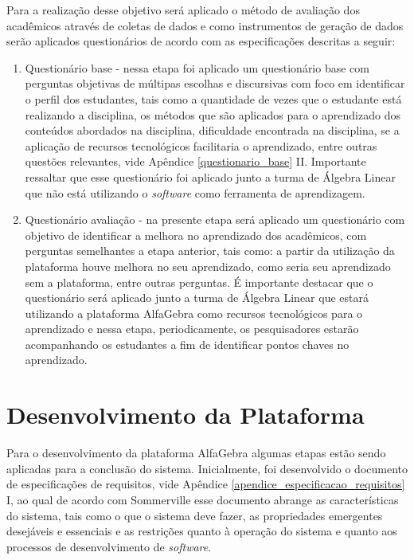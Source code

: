 Para a realização desse objetivo será aplicado o método de avaliação dos acadêmicos através de coletas de dados e como instrumentos de geração de dados serão aplicados questionários de acordo com as especificações descritas a seguir:

\begin{enumerate}
    \item Questionário base - nessa etapa foi aplicado um questionário base com perguntas objetivas de múltipas escolhas e discursivas com foco em identificar o perfil dos estudantes, tais como a quantidade de vezes que o estudante está realizando a disciplina, os métodos que são aplicados para o aprendizado dos conteúdos abordados na disciplina, dificuldade encontrada na disciplina, se a aplicação de recursos tecnológicos facilitaria o aprendizado, entre outras questões relevantes, vide Apêndice \ref{questionario_base} II. Importante ressaltar que esse questionário foi aplicado junto a turma de Álgebra Linear que não está utilizando o \textit{software} como ferramenta de aprendizagem.
    
    \item Questionário avaliação - na presente etapa será aplicado um questionário com objetivo de identificar a melhora no aprendizado dos acadêmicos, com perguntas semelhantes a etapa anterior, tais como: a partir da utilização da plataforma houve melhora no seu aprendizado, como seria seu aprendizado sem a plataforma, entre outras perguntas. É importante destacar que o questionário será aplicado junto a turma de Álgebra Linear que estará utilizando a plataforma AlfaGebra como recursos tecnológicos para o aprendizado e nessa etapa, periodicamente, os pesquisadores estarão acompanhando os estudantes a fim de identificar pontos chaves no aprendizado.
\end{enumerate}


\section{Desenvolvimento da Plataforma}
\noindent Para o desenvolvimento da plataforma AlfaGebra algumas etapas estão sendo aplicadas para a conclusão do sistema. Inicialmente, foi desenvolvido o documento de especificações de requisitos, vide Apêndice \ref{apendice_especificacao_requisitos} I, ao qual de acordo com Sommerville \cite{2013:Sommerville} esse documento abrange as características do sistema, tais como o que o sistema deve fazer, as propriedades emergentes desejáveis e essenciais e as restrições quanto à operação do sistema e quanto aos processos de desenvolvimento de \textit{software}. 

